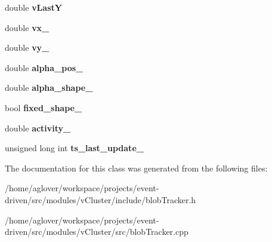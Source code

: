 \begin{DoxyCompactItemize}
\item 
double {\bfseries v\+LastY}\hypertarget{classBlobTracker_ae836b9dd8d830ba8f6ccb6ea2f80e313}{}\label{classBlobTracker_ae836b9dd8d830ba8f6ccb6ea2f80e313}

\item 
double {\bfseries vx\+\_\+}\hypertarget{classBlobTracker_a98a091e1f3a0e16a71ff6602079c9c23}{}\label{classBlobTracker_a98a091e1f3a0e16a71ff6602079c9c23}

\item 
double {\bfseries vy\+\_\+}\hypertarget{classBlobTracker_a5b41c1c66d14c8b794b314ba204a93bd}{}\label{classBlobTracker_a5b41c1c66d14c8b794b314ba204a93bd}

\item 
double {\bfseries alpha\+\_\+pos\+\_\+}\hypertarget{classBlobTracker_ae10a65c546bfa9ed53d341a46080f53f}{}\label{classBlobTracker_ae10a65c546bfa9ed53d341a46080f53f}

\item 
double {\bfseries alpha\+\_\+shape\+\_\+}\hypertarget{classBlobTracker_a5183d2c99bd9dbc6f7170050e5830dea}{}\label{classBlobTracker_a5183d2c99bd9dbc6f7170050e5830dea}

\item 
bool {\bfseries fixed\+\_\+shape\+\_\+}\hypertarget{classBlobTracker_a57841b67cf49324e2ff7b9698897e908}{}\label{classBlobTracker_a57841b67cf49324e2ff7b9698897e908}

\item 
double {\bfseries activity\+\_\+}\hypertarget{classBlobTracker_aaf83587414449f41fa7719f9939c48a8}{}\label{classBlobTracker_aaf83587414449f41fa7719f9939c48a8}

\item 
unsigned long int {\bfseries ts\+\_\+last\+\_\+update\+\_\+}\hypertarget{classBlobTracker_a4084fae015313204286ce98259856467}{}\label{classBlobTracker_a4084fae015313204286ce98259856467}

\end{DoxyCompactItemize}


The documentation for this class was generated from the following files\+:\begin{DoxyCompactItemize}
\item 
/home/aglover/workspace/projects/event-\/driven/src/modules/v\+Cluster/include/blob\+Tracker.\+h\item 
/home/aglover/workspace/projects/event-\/driven/src/modules/v\+Cluster/src/blob\+Tracker.\+cpp\end{DoxyCompactItemize}
